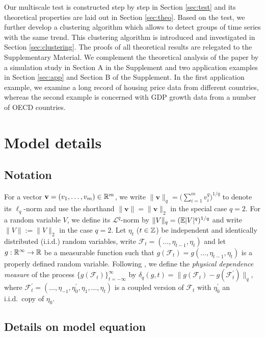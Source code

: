 \documentclass[12pt]{article}
\makeatletter
\renewcommand{\eqref}[1]{\tagform@{\ref{#1}}}
\makeatother
\begin{document}
Our multiscale test is constructed step by step in Section \ref{sec:test} and its theoretical properties are laid out in Section \ref{sec:theo}. Based on the test, we further develop a clustering algorithm which allows to detect groups of time series with the same trend. This clustering algorithm is introduced and investigated in Section \ref{sec:clustering}. The proofs of all theoretical results are relegated to the Supplementary Material. We complement the theoretical analysis of the paper by a simulation study in Section A in the Supplement and two application examples in Section \ref{sec:app} and Section B of the Supplement. In the first application example, we examine a long record of housing price data from different countries, whereas the second example is concerned with GDP growth data from a number of OECD countries. 



\section{Model details}\label{sec:model}


\subsection{Notation}\label{subsec:model_notation}


For a vector $\mathbf{v} = (v_1, \ldots, v_m)\in\mathbb{R}^m$, we write $\|\mathbf{v}\|_q = \big(\sum_{i=1}^m v_i^q\big)^{1/q}$ to denote its $\ell_q$-norm and use the shorthand $\|\mathbf{v}\| = \|\mathbf{v}\|_2$ in the special case $q = 2$. For a random variable $V$, we define its $\mathcal{L}^q$-norm by $\|V\|_q = (\mathbb{E} |V|^q)^{1/q}$ and write $\|V\| := \|V\|_2$ in the case $q = 2$.
Let $\eta_t$ ($t \in \mathbb{Z}$) be independent and identically distributed ($\text{i.i.d.}$) random variables, write $\mathcal{F}_t  = (\ldots, \eta_{t-1}, \eta_t)$ and let $g: \mathbb{R}^\infty \to \mathbb{R}$ be a measurable function such that $g(\mathcal{F}_t) = g(\ldots, \eta_{t-1}, \eta_t)$ is a properly defined random variable. Following \cite{Wu2005}, we define the \textit{physical dependence measure} of the process $\{g(\mathcal{F}_t)\}_{t=-\infty}^\infty$ by $\delta_q(g, t) = \| g(\mathcal{F}_t) - g(\mathcal{F}_t^\prime) \|_q$, where $\mathcal{F}_t^\prime  = (\ldots, \eta_{-1}, \eta^\prime_0, \eta_1, \ldots, \eta_t)$ is a coupled version of $\mathcal{F}_t$ with $\eta_0^\prime$ an i.i.d.\ copy of $\eta_0$. 


\subsection{Details on model equation \eqref{eq:model_full}}\label{subsec:model_setting}
\end{document}
